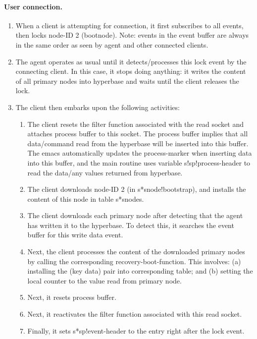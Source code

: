 \paragraph{User connection.}
\begin{enumerate}
  
\item When a client is attempting for connection, it first
  subscribes to all events, then locks node-ID 2 (bootnode).  Note:
  events in the event buffer are always in the same order as seen
  by agent and other connected clients.
  
\item The agent operates as usual until it detects/processes this lock
  event by the connecting client. In this case, it stops doing anything: it
  writes the content of all primary nodes into hyperbase and waits until the
  client releases the lock.
  
\item The client then embarks upon the following activities: 
\begin{enumerate}
\item The client resets the filter function associated with the read
  socket and attaches process buffer to this socket.  The process buffer
  implies that all data/command read from the hyperbase will be inserted
  into this buffer. The emacs automatically updates the process-marker
  when inserting data into this buffer, and the main routine uses variable
  s!sp!process-header to read the data/any values returned from hyperbase.
  
\item The client downloads node-ID 2 (in s*snode!bootstrap), and installs
  the content of this node in table s*snodes.
  
\item The client downloads each primary node after detecting that the
  agent has written it to the hyperbase. To detect this, it searches the
  event buffer for this write data event.
  
\item Next, the client processes the content of the downloaded primary
  nodes by calling the corresponding recovery-boot-function. This involves:
  (a) installing the (key data) pair into corresponding table; and (b)
  setting the local counter to the value read from primary node.

\item Next, it resets process buffer.
\item Next, it reactivates the filter function associated with this read
  socket.  
\item Finally, it sets s*sp!event-header to the entry right after the lock
  event.
\end{enumerate}
  

\end{enumerate}
